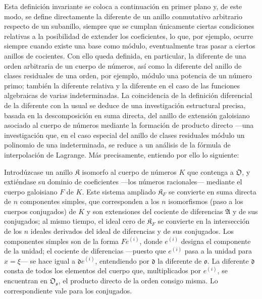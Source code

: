 Esta definición invariante se coloca a continuación en primer plano y, de este modo, se define directamente la diferente de un anillo conmutativo arbitrario respecto de un subanillo, siempre que se cumplan únicamente ciertas condiciones relativas a la posibilidad de extender los coeficientes, lo que, por ejemplo, ocurre siempre cuando existe una base como módulo, eventualmente tras pasar a ciertos anillos de cocientes. Con ello queda definida, en particular, la diferente de una orden arbitraria de un cuerpo de números, así como la diferente del anillo de clases residuales de una orden, por ejemplo, módulo una potencia de un número primo; también la diferente relativa y la diferente en el caso de las funciones algebraicas de varias indeterminadas. La coincidencia de la definición diferencial de la diferente con la usual se deduce de una investigación estructural precisa, basada en la descomposición en suma directa, del anillo de extensión galoisiano asociado al cuerpo de números mediante la formación de producto directo ---una investigación que, en el caso especial del anillo de clases residuales módulo un polinomio de una indeterminada, se reduce a un análisis de la fórmula de interpolación de Lagrange. Más precisamente, entiendo por ello lo siguiente:

Introdúzcase un anillo $\mathfrak K$ isomorfo al cuerpo de números $K$ que contenga a $\mathfrak O$, y extiéndase su dominio de coeficientes ---los números racionales--- mediante el cuerpo galoisiano $F$ de $K$. Este sistema ampliado $\mathfrak K_F$ se convierte en suma directa de $n$ componentes simples, que corresponden a los $n$ isomorfismos (paso a los cuerpos conjugados) de $K$ y son extensiones del cociente de diferencias $\mathfrak A$ y de sus conjugados; al mismo tiempo, el ideal cero de $\mathfrak K_F$ se convierte en la intersección de los $n$ ideales derivados del ideal de diferencias y de sus conjugados. Los componentes simples son de la forma $Fe^{(i)}$, donde $e^{(i)}$ designa el componente de la unidad; el cociente de diferencias ---puesto que $e^{(i)}$ pasa a la unidad para $x=\xi$--- se hace igual a $\mathfrak d e^{(i)}$, entendiendo por $\mathfrak d$ la diferente de $\mathfrak o$. La diferente $\mathfrak d$ consta de todos los elementos del cuerpo que, multiplicados por $e^{(i)}$, se encuentran en $\mathfrak O_{\mathfrak o}$, el producto directo de la orden consigo misma. Lo correspondiente vale para los conjugados.

